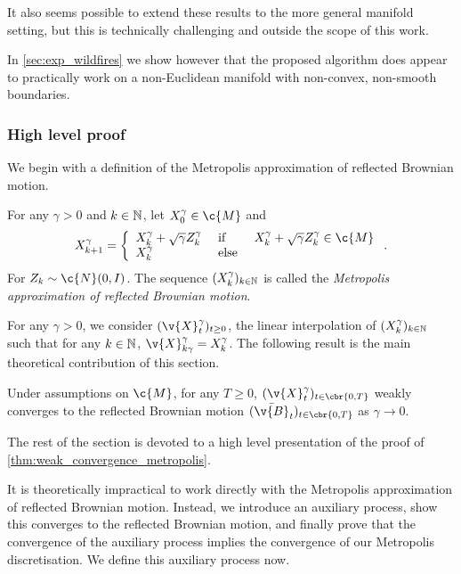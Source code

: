 It also seems possible to extend these results to the more general manifold setting, but this is technically challenging and outside the scope of this work.

In \cref{sec:exp_wildfires} we show however that the proposed algorithm does appear to practically work on a non-Euclidean manifold with non-convex, non-smooth boundaries.

\subsubsection{High level proof}
We begin with a definition of the Metropolis approximation of reflected Brownian motion.

\begin{definition}
	For any \(\gamma >0\) and \(k \in \mathbb{N}\), let \(X_0^\gamma \in \c{M}\) and 
	\[
		X_{k+1}^\gamma = \left\{ \begin{array}{lll}
			X_k^\gamma + \sqrt{\gamma} Z_k^\gamma & \text{ if } & X_k^\gamma + \sqrt{\gamma} Z_k^\gamma \in \c{M} \\
			X_k^\gamma & \text{ else } &
		\end{array} \right. .
	\]
	For \(Z_k \sim \c{N}(0, I)\).
	The sequence \((X_k^\gamma)_{k \in \mathbb{N}}\) is called the \emph{Metropolis approximation of reflected Brownian motion}.
\end{definition}
For any \(\gamma > 0\), we consider \((\v{X}_t^\gamma)_{t \geq 0}\), the linear interpolation of \((X^\gamma_k)_{k \in \mathbb{N}}\) such that for any \(k \in \mathbb{N}\), \(\v{X}_{k \gamma}^\gamma = X_k^\gamma\).
The following result is the main theoretical contribution of this section.

\begin{theorem}
	\label{thm:weak_convergence_metropolis}
	Under assumptions on \(\c{M}\), for any \(T \geq 0\), \((\v{X}_t^\gamma)_{t \in \cbr{0,T}}\) weakly converges to the reflected Brownian motion \((\bar{\v{B}}_t)_{t \in \cbr{0,T}}\) as \(\gamma \to 0\).
\end{theorem}

The rest of the section is devoted to a high level presentation of the proof of \cref{thm:weak_convergence_metropolis}.

It is theoretically impractical to work directly with the Metropolis approximation of reflected Brownian motion.
Instead, we introduce an auxiliary process, show this converges to the reflected Brownian motion, and finally prove that the convergence of the auxiliary process implies the convergence of our Metropolis discretisation.
We define this auxiliary process now.

